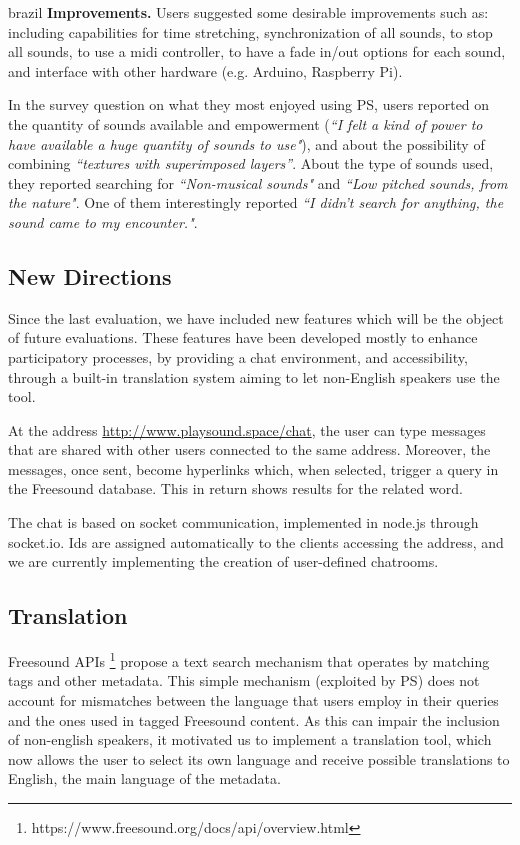 \begin{otherlanguage*}{brazil}
\textbf{Improvements.} Users suggested some desirable improvements such as: including capabilities for time stretching, synchronization of all sounds, to stop all sounds, to use a midi controller, to have a fade in/out options for each sound, and interface with other hardware (e.g. Arduino, Raspberry Pi).

In the survey question on what they most enjoyed using PS, users reported on the quantity of sounds available and empowerment (\textit{``I felt a kind of power to have available a huge quantity of sounds to use"}), and about the possibility of combining \textit{``textures with superimposed layers''}. About the type of sounds used, they reported searching for \textit{``Non-musical sounds"} and \textit{``Low pitched sounds, from the nature"}. One of them interestingly reported \textit{``I didn't search for anything, the sound came to my encounter."}.

\subsection{New Directions}

Since the last evaluation, we have included new features which will be the object of future evaluations. These features have been developed mostly to enhance participatory processes, by providing a chat environment, and accessibility, through a built-in translation system aiming to let non-English speakers use the tool.

At the address \url{http://www.playsound.space/chat}, the user can type messages that are shared with other users connected to the same address. Moreover, the messages, once sent, become hyperlinks which, when selected, trigger a query in the Freesound database. This in return shows results for the related word. 

The chat is based on socket communication, implemented in node.js through socket.io. Ids are assigned automatically to the clients accessing the address, and we are currently implementing the creation of user-defined chatrooms.

\subsection{Translation}

Freesound APIs \footnote{https://www.freesound.org/docs/api/overview.html} propose a text search mechanism that operates by matching tags and other metadata. This simple mechanism (exploited by PS) does not account for mismatches between the language that users employ in their queries and the ones used in tagged Freesound content. As this can impair the inclusion of non-english speakers, it motivated us to implement a translation tool, which now allows the user to select its own language and receive possible translations to English, the main language of the metadata. 


\end{otherlanguage*}
